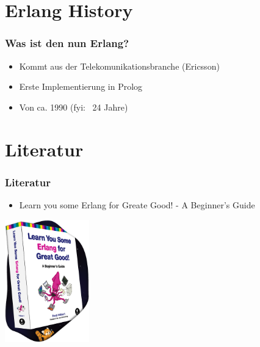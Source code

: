 \section{Erlang History}
\begin{frame} %
  \frametitle{Was ist den nun Erlang?} %
  \begin{itemize} %
    \item Kommt aus der Telekomunikationsbranche (Ericsson)
    \item Erste Implementierung in Prolog
    \item Von ca. 1990 (fyi: ~24 Jahre)
  \end{itemize}
\end{frame}

\section{Literatur}
\begin{frame} %
  \frametitle{Literatur} %
  \begin{itemize} %
    \item Learn you some Erlang for Greate Good! - A Beginner's Guide
  \end{itemize}
  \includegraphics[height=200px]{img/splash-book}
\end{frame}


